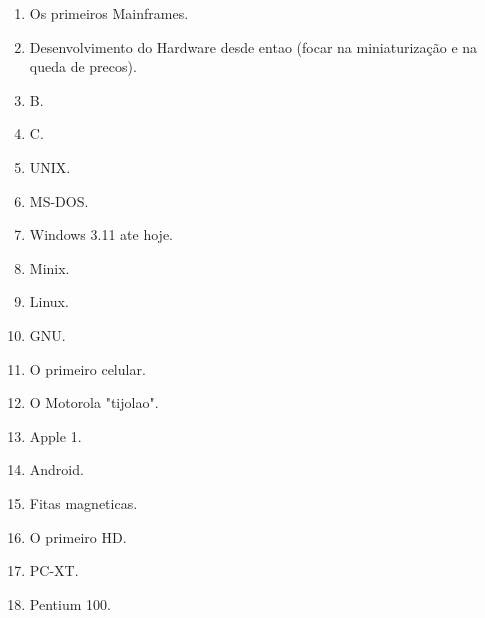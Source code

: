 \begin{enumerate}
	\item Os primeiros Mainframes.
	\item Desenvolvimento do Hardware desde entao (focar na miniaturização e na queda de precos).
	\item B.
	\item C.
	\item UNIX.
	\item MS-DOS.
	\item Windows 3.11 ate hoje.
	\item Minix.
	\item Linux.
	\item GNU.
	\item O primeiro celular.
	\item O Motorola "tijolao".
	\item Apple 1.
	\item Android.
\item Fitas magneticas.
\item O primeiro HD.
\item PC-XT.
\item Pentium 100.
\end{enumerate}

